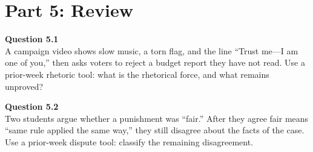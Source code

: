 \documentclass[12pt]{article}
\begin{document}

\newpage

\section*{Part 5: Review}

\textbf{Question 5.1}\\[-0.15em]
A campaign video shows slow music, a torn flag, and the line ``Trust me---I am one of you,'' then asks voters to reject a budget report they have not read. Use a prior-week rhetoric tool: what is the rhetorical force, and what remains unproved?


\textbf{Question 5.2}\\[-0.15em]
Two students argue whether a punishment was ``fair.'' After they agree fair means ``same rule applied the same way,'' they still disagree about the facts of the case. Use a prior-week dispute tool: classify the remaining disagreement.

\end{document}
